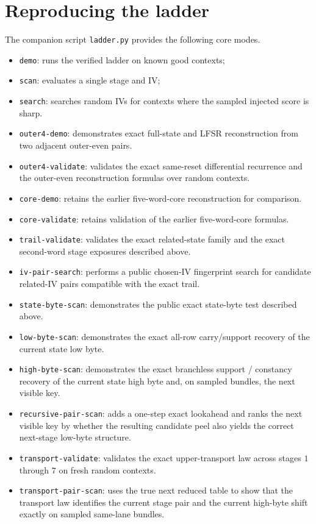 \documentclass[11pt]{article}
\begin{document}
\section{Reproducing the ladder}
The companion script \texttt{ladder.py} provides the following core modes.
\begin{itemize}
\item \texttt{demo}: runs the verified ladder on known good contexts;
\item \texttt{scan}: evaluates a single stage and IV;
\item \texttt{search}: searches random IVs for contexts where the sampled injected score is sharp.
\item \texttt{outer4-demo}: demonstrates exact full-state and LFSR reconstruction from two adjacent outer-even pairs.
\item \texttt{outer4-validate}: validates the exact same-reset differential recurrence and the outer-even reconstruction formulas over random contexts.
\item \texttt{core-demo}: retains the earlier five-word-core reconstruction for comparison.
\item \texttt{core-validate}: retains validation of the earlier five-word-core formulas.
\item \texttt{trail-validate}: validates the exact related-state family and the exact second-word stage exposures described above.
\item \texttt{iv-pair-search}: performs a public chosen-IV fingerprint search for candidate related-IV pairs compatible with the exact trail.
\item \texttt{state-byte-scan}: demonstrates the public exact state-byte test described above.
\item \texttt{low-byte-scan}: demonstrates the exact all-row carry/support recovery of the current state low byte.
\item \texttt{high-byte-scan}: demonstrates the exact branchless support / constancy recovery of the current state high byte and, on sampled bundles, the next visible key.
\item \texttt{recursive-pair-scan}: adds a one-step exact lookahead and ranks the next visible key by whether the resulting candidate peel also yields the correct next-stage low-byte structure.
\item \texttt{transport-validate}: validates the exact upper-transport law across stages $1$ through $7$ on fresh random contexts.
\item \texttt{transport-pair-scan}: uses the true next reduced table to show that the transport law identifies the current stage pair and the current high-byte shift exactly on sampled same-lane bundles.
\end{itemize}
\end{document}
